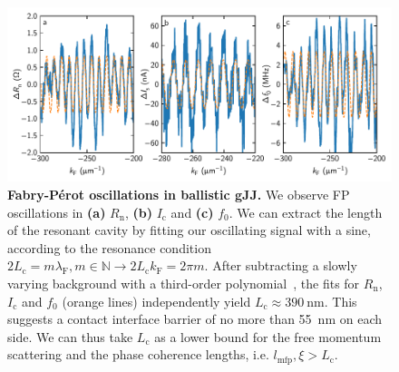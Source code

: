 \begin{figure}[]
	\centering
	\includegraphics[width=\linewidth]{chapter-gJJ/figs/si_fabryperot}
	\caption{{\bf Fabry-P\'erot oscillations in ballistic gJJ.}
		We observe FP oscillations in \textbf{(a)} $R_\text{n}$, \textbf{(b)} $I_\text{c}$ and \textbf{(c)} $f_0$.
		We can extract the length of the resonant cavity by fitting our oscillating signal with a sine, according to the resonance condition $2L_\text{c} = m\lambda_\text{F}, m\in\mathbb{N} \rightarrow 2L_\text{c} k_\text{F} = 2\pi m$.
		After subtracting a slowly varying background with a third-order polynomial~\cite{caladoBallisticJosephsonJunctions2015d}, the fits for $R_\text{n}$, $I_\text{c}$ and $f_0$ (orange lines) independently yield $L_\text{c}\approx \SI{390}{\nano\meter}$.
		This suggests a contact interface barrier of no more than \SI{55}{\nano\meter} on each side.
		We can thus take $L_\text{c}$ as a lower bound for the free momentum scattering and the phase coherence lengths, i.e. $l_\text{mfp},\xi>L_\text{c}$.        }
	\label{gJJfig:fabry-perot}
\end{figure}

